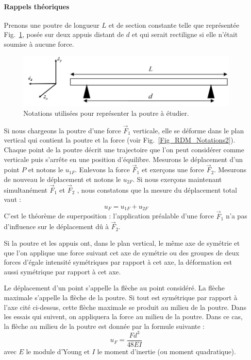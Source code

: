 \documentclass[lecture.tex]{subfiles}
\begin{document}
\paragraph*{Rappels théoriques}
Prenons une poutre de longueur $L$ et de section constante telle que représentée Fig.~\ref{Fig_RDM_Notations}, posée sur deux appuis distant de $d$ et qui serait rectiligne si elle n'était soumise à aucune force.
\begin{figure}[h!]
\centering
\includegraphics[scale=0.4]{Img_RDM_1.PNG}
\caption{Notations utilisées pour représenter la poutre à étudier.}
\label{Fig_RDM_Notations}
\end{figure}

Si nous chargeons la poutre d'une force $\vec{F}_1$ verticale, elle se déforme dans le plan vertical qui contient la poutre et la force (voir Fig.~\ref{Fig_RDM_Notations2}). Chaque point de la poutre décrit une trajectoire que l'on peut considérer comme verticale puis s'arrête en une position d'équilibre. Mesurons le déplacement d'un point $P$ et notons le $u_{1F}$. Enlevons la force $\vec{F}_1$  et exerçons une force $\vec{F}_2$.  Mesurons de nouveau le déplacement et notons le $u_{2F}$. Si nous exerçons maintenant simultanément $\vec{F}_1$  et $\vec{F}_2$ , nous constatons que la mesure du déplacement total vaut :
\begin{equation*}
u_F =u_{1F}+u_{2F}
\end{equation*}
C'est le théorème de superposition : l'application préalable d'une force $\vec{F}_1$  n'a pas d'influence sur le déplacement dû à $\vec{F}_2$.
\vspace{\baselineskip}

Si la poutre et les appuis ont, dans le plan vertical, le même axe de symétrie et que l'on applique une force suivant cet axe de symétrie ou des groupes de deux forces d'égale intensité symétriques par rapport à cet axe, la déformation est aussi symétrique par rapport à cet axe.
\vspace{\baselineskip}

Le déplacement d'un point s'appelle la flèche au point considéré. La flèche maximale s'appelle la flèche de la poutre. Si tout est symétrique par rapport à l'axe cité ci-dessus, cette flèche maximale se produit au milieu de la poutre. Dans les essais qui suivent, on appliquera la force au milieu de la poutre. Dans ce cas, la flèche au milieu de la poutre est donnée par la formule suivante :
\begin{equation}
u_F = \dfrac{Fd^3}{48 EI}
\end{equation}
avec $E$ le module d'Young et $I$ le moment d'inertie (ou moment quadratique).
\end{document}
